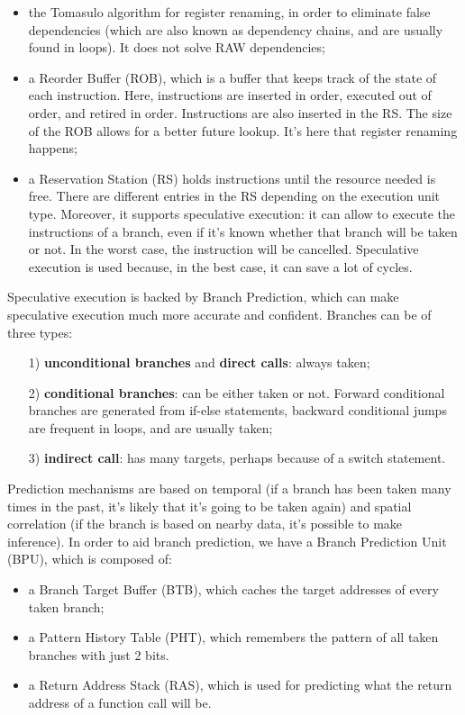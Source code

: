 \begin{itemize}
    \item the Tomasulo algorithm for register renaming, in order to eliminate false dependencies (which are also known as dependency chains, and are usually found in loops). It does not solve RAW dependencies;
    \item a Reorder Buffer (ROB), which is a buffer that keeps track of the state of each instruction. Here, instructions are inserted in order, executed out of order, and retired in order. Instructions are also inserted in the RS. The size of the ROB allows for a better future lookup. It's here that register renaming happens;
    \item a Reservation Station (RS) holds instructions until the resource needed is free. There are different entries in the RS depending on the execution unit type. Moreover, it supports speculative execution: it can allow to execute the instructions of a branch, even if it's known whether that branch will be taken or not. In the worst case, the instruction will be cancelled. Speculative execution is used because, in the best case, it can save a lot of cycles. 
\end{itemize}

Speculative execution is backed by Branch Prediction, which can make speculative execution much more accurate and confident. Branches can be of three types:
\begin{itemize}
    \item [1)] \textbf{unconditional branches} and \textbf{direct calls}: always taken;
    \item [2)] \textbf{conditional branches}: can be either taken or not. Forward conditional branches are generated from if-else statements, backward conditional jumps are frequent in loops, and are usually taken;
    \item [3)] \textbf{indirect call}: has many targets, perhaps because of a switch statement.
\end{itemize}

Prediction mechanisms are based on temporal (if a branch has been taken many times in the past, it's likely that it's going to be taken again) and spatial correlation (if the branch is based on nearby data, it's possible to make inference).
\nwl
In order to aid branch prediction, we have a Branch Prediction Unit (BPU), which is composed of:
\begin{itemize}
    \item a Branch Target Buffer (BTB), which caches the target addresses of every taken branch;
    \item a Pattern History Table (PHT), which remembers the pattern of all taken branches with just 2 bits. 
    \item a Return Address Stack (RAS), which is used for predicting what the return address of a function call will be.
\end{itemize}

